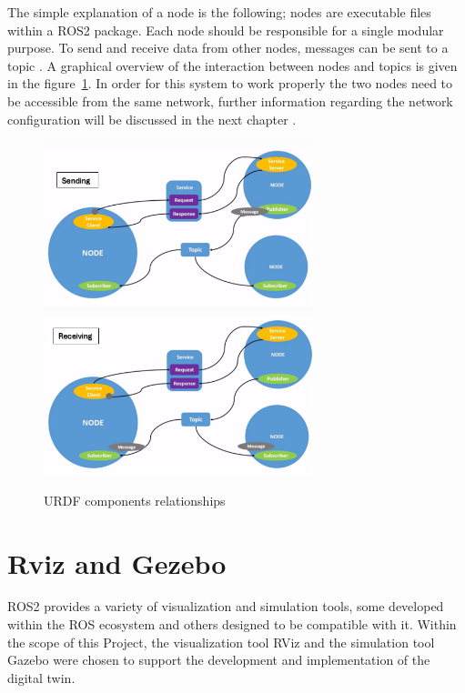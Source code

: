 The simple explanation of a node is the following; nodes are executable files within a ROS2 package. Each node should be responsible for a single modular purpose. To send and receive data from other nodes, messages can be sent to a topic \autocite{openroboticsUnderstandingNodesROS}. A graphical overview of the interaction between nodes and topics is given in the figure~\ref{fig:Node_topics}. In order for this system to work properly the two nodes need to be accessible from the same network, further information regarding the network configuration will be discussed in the next chapter . 

\begin{figure}[h]
    \centering
    \includegraphics[width=0.7\textwidth]{Figures/Nodes_topics.png}
    \caption{URDF components relationships}
    \label{fig:Node_topics}
    \autocite{Interaction nodes and topics}
\end{figure}

\newpage
\section{Rviz and Gezebo}

ROS2 provides a variety of visualization and simulation tools, some developed within the ROS ecosystem and others designed to be compatible with it. Within the scope of this Project, the visualization tool RViz and the simulation tool Gazebo were chosen to support the development and implementation of the digital twin.

